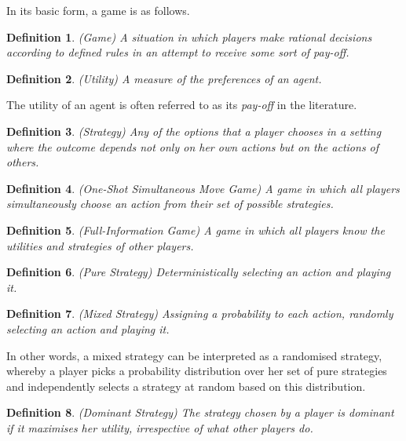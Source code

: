 \documentclass{article}
\newtheorem{definition}{Definition}
\begin{document}
In its basic form, a game is as follows.

\begin{definition}
(Game) A situation in which players make rational decisions according to defined rules in an attempt to receive some sort of pay-off.
\end{definition}

\begin{definition}
(Utility) A measure of the preferences of an agent.
\end{definition}

The utility of an agent is often referred to as its \textit{pay-off} in the literature.

\begin{definition}
(Strategy) Any of the options that a player chooses in a setting where the outcome depends not only on her own actions but on the actions of others.
\end{definition}

\begin{definition}
(One-Shot Simultaneous Move Game) A game in which all players simultaneously choose an action from their set of possible strategies.
\end{definition}

\begin{definition}
(Full-Information Game) A game in which all players know the utilities and strategies of other players.
\end{definition}

\begin{definition}
(Pure Strategy) Deterministically selecting an action and playing it.
\end{definition}

\begin{definition}
(Mixed Strategy) Assigning a probability to each action, randomly selecting an action and playing it.
\end{definition}

In other words, a mixed strategy can be interpreted as a randomised strategy, whereby a player picks a probability distribution over her set of pure strategies and independently selects a strategy at random based on this distribution.

\begin{definition}
(Dominant Strategy) The strategy chosen by a player is dominant if it maximises her utility, irrespective of what other players do.
\end{definition}
\end{document}
